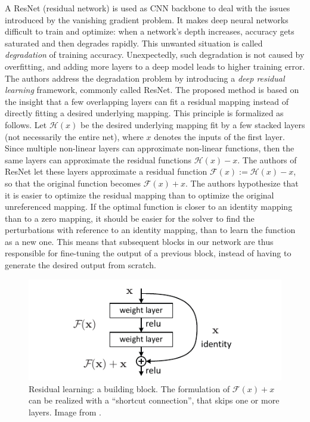 A ResNet (residual network) \cite{resnet} is used as CNN backbone to deal with the issues introduced by the vanishing gradient problem. It makes deep neural networks difficult to train and optimize: when a network's depth increases, accuracy gets saturated and then degrades rapidly. This unwanted situation is called \textit{degradation} of training accuracy. Unexpectedly, such degradation is not caused by overfitting, and adding
more layers to a deep model leads to higher training error. The authors address the degradation problem by introducing a \textit{deep residual learning} framework, commonly called ResNet. The proposed method is based on the insight that a few overlapping layers can fit a residual mapping instead of directly fitting a desired underlying mapping. This principle is formalized as follows. Let $\mathcal{H}(x)$ be the desired underlying mapping fit by a few stacked layers (not necessarily the entire net), where $x$ denotes the inputs of the first layer. Since multiple non-linear layers can approximate non-linear functions, then  the same layers can approximate the residual functions $\mathcal{H}(x) - x$. The authors of ResNet \cite{resnet} let these layers approximate a residual function
$\mathcal{F}(x) := \mathcal{H}(x) - x$, so that the original function becomes
$\mathcal{F}(x)+x$. The authors hypothesize that it is easier to optimize the residual mapping than to optimize the original unreferenced mapping.  If the optimal function is closer to an identity
mapping than to a zero mapping, it should be easier for the
solver to find the perturbations with reference to an identity
mapping, than to learn the function as a new one. This means that subsequent blocks in our network are thus responsible for fine-tuning the output of a previous block, instead of having to generate the desired output from scratch.

\begin{figure}[h!]
	\centering
	\includegraphics[width=\linewidth]{images/residualblock.pdf}
	\caption{Residual learning: a building block. The formulation of $\mathcal{F}(x)+x$ can be realized with a ``shortcut connection'', that skips one or more layers. Image from \cite{resnet}.}
	\label{fig:resblock}
\end{figure}

